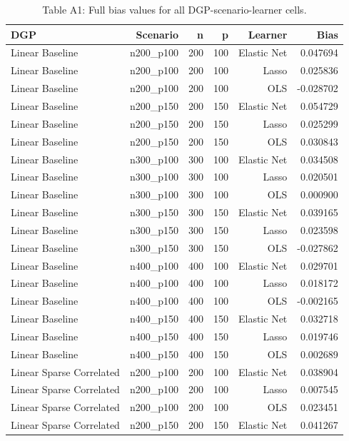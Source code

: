 \begin{table}[!htbp]
\centering
\caption*{Table A1: Full bias values for all DGP-scenario-learner cells.}
\label{tab:bias-a1}
\begin{tabular}{lrrrrr}
 \hline
DGP & Scenario & n & p & Learner & Bias \\
 \hline
Linear Baseline & n200\_p100 & 200 & 100 & Elastic Net & 0.047694 \\
Linear Baseline & n200\_p100 & 200 & 100 & Lasso & 0.025836 \\
Linear Baseline & n200\_p100 & 200 & 100 & OLS & -0.028702 \\
Linear Baseline & n200\_p150 & 200 & 150 & Elastic Net & 0.054729 \\
Linear Baseline & n200\_p150 & 200 & 150 & Lasso & 0.025299 \\
Linear Baseline & n200\_p150 & 200 & 150 & OLS & 0.030843 \\
Linear Baseline & n300\_p100 & 300 & 100 & Elastic Net & 0.034508 \\
Linear Baseline & n300\_p100 & 300 & 100 & Lasso & 0.020501 \\
Linear Baseline & n300\_p100 & 300 & 100 & OLS & 0.000900 \\
Linear Baseline & n300\_p150 & 300 & 150 & Elastic Net & 0.039165 \\
Linear Baseline & n300\_p150 & 300 & 150 & Lasso & 0.023598 \\
Linear Baseline & n300\_p150 & 300 & 150 & OLS & -0.027862 \\
Linear Baseline & n400\_p100 & 400 & 100 & Elastic Net & 0.029701 \\
Linear Baseline & n400\_p100 & 400 & 100 & Lasso & 0.018172 \\
Linear Baseline & n400\_p100 & 400 & 100 & OLS & -0.002165 \\
Linear Baseline & n400\_p150 & 400 & 150 & Elastic Net & 0.032718 \\
Linear Baseline & n400\_p150 & 400 & 150 & Lasso & 0.019746 \\
Linear Baseline & n400\_p150 & 400 & 150 & OLS & 0.002689 \\
Linear Sparse Correlated & n200\_p100 & 200 & 100 & Elastic Net & 0.038904 \\
Linear Sparse Correlated & n200\_p100 & 200 & 100 & Lasso & 0.007545 \\
Linear Sparse Correlated & n200\_p100 & 200 & 100 & OLS & 0.023451 \\
Linear Sparse Correlated & n200\_p150 & 200 & 150 & Elastic Net & 0.041267 \\

\end{tabular}
\end{table}
